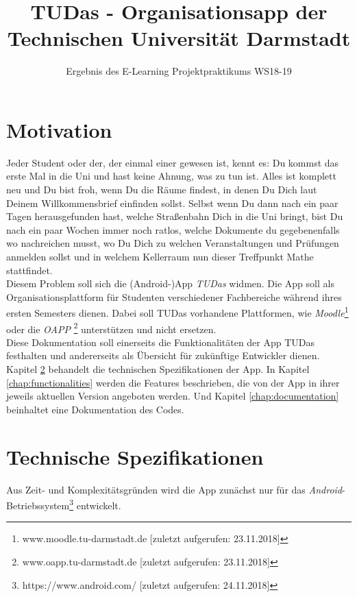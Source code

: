 \documentclass[noindent]{tudreport}
\title{TUDas - Organisationsapp der Technischen Universität Darmstadt}
\subtitle{Ergebnis des E-Learning Projektpraktikums WS18-19}
\begin{document}
	\lstset{language=Java}
	\maketitle
	\tableofcontents
	
	\chapter{Motivation}
		Jeder Student oder der, der einmal einer gewesen ist, kennt es: Du kommst das erste Mal in die Uni und hast keine Ahnung, was zu tun ist. Alles ist komplett neu und Du bist froh, wenn Du die Räume findest, in denen Du Dich laut Deinem Willkommensbrief einfinden sollst. Selbst wenn Du dann nach ein paar Tagen herausgefunden hast, welche Straßenbahn Dich in die Uni bringt, bist Du nach ein paar Wochen immer noch ratlos, welche Dokumente du gegebenenfalls wo nachreichen musst, wo Du Dich zu welchen Veranstaltungen und Prüfungen anmelden sollst und in welchem Kellerraum nun dieser Treffpunkt Mathe stattfindet.\\
		
		Diesem Problem soll sich die (Android-)App \textit{TUDas} widmen. Die App soll als Organisationsplattform für Studenten verschiedener Fachbereiche während ihres ersten Semesters dienen. Dabei soll TUDas vorhandene Plattformen, wie \textit{Moodle}\footnote{www.moodle.tu-darmstadt.de [zuletzt aufgerufen: 23.11.2018]} oder die \textit{OAPP} \footnote{www.oapp.tu-darmstadt.de [zuletzt aufgerufen: 23.11.2018]} unterstützen und nicht ersetzen.\\
		
		Diese Dokumentation soll einerseits die Funktionalitäten der App TUDas festhalten und andererseits als Übersicht für zukünftige Entwickler dienen. Kapitel \ref{chap:technical_specifications} behandelt die technischen Spezifikationen der App. In Kapitel \ref{chap:functionalities} werden die Features beschrieben, die von der App in ihrer jeweils aktuellen Version angeboten werden. Und Kapitel \ref{chap:documentation} beinhaltet eine Dokumentation des Codes.
		
	\chapter{Technische Spezifikationen}\label{chap:technical_specifications}
		Aus Zeit- und Komplexitätsgründen wird die App zunächst nur für das \textit{Android}-Betriebssystem\footnote{https://www.android.com/ [zuletzt aufgerufen: 24.11.2018]} entwickelt.
	
\end{document}
